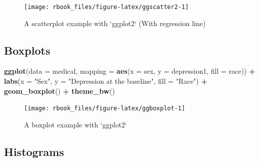 \documentclass[]{book}
\newenvironment{Shaded}{\begin{snugshade}}{\end{snugshade}}
\newcommand{\DataTypeTok}[1]{\textcolor[rgb]{0.13,0.29,0.53}{#1}}
\newcommand{\KeywordTok}[1]{\textcolor[rgb]{0.13,0.29,0.53}{\textbf{#1}}}
\newcommand{\NormalTok}[1]{#1}
\newcommand{\OperatorTok}[1]{\textcolor[rgb]{0.81,0.36,0.00}{\textbf{#1}}}
\newcommand{\StringTok}[1]{\textcolor[rgb]{0.31,0.60,0.02}{#1}}
\begin{document}
\begin{figure}

{\centering \texttt{[image: rbook\_files/figure-latex/ggscatter2-1]} 

}

\caption{A scatterplot example with `ggplot2` (With regression line)}\label{fig:ggscatter2}
\end{figure}

\hypertarget{boxplots-1}{%
\subsection{Boxplots}\label{boxplots-1}}

\begin{Shaded}
\begin{Highlighting}[]
\KeywordTok{ggplot}\NormalTok{(}\DataTypeTok{data =}\NormalTok{ medical, }
       \DataTypeTok{mapping =} \KeywordTok{aes}\NormalTok{(}\DataTypeTok{x =}\NormalTok{ sex, }\DataTypeTok{y =}\NormalTok{ depression1, }\DataTypeTok{fill =}\NormalTok{ race)) }\OperatorTok{+}\StringTok{ }
\StringTok{  }\KeywordTok{labs}\NormalTok{(}\DataTypeTok{x =} \StringTok{"Sex"}\NormalTok{, }
       \DataTypeTok{y =} \StringTok{"Depression at the baseline"}\NormalTok{, }
       \DataTypeTok{fill =} \StringTok{"Race"}\NormalTok{) }\OperatorTok{+}\StringTok{ }
\StringTok{  }\KeywordTok{geom_boxplot}\NormalTok{() }\OperatorTok{+}
\StringTok{  }\KeywordTok{theme_bw}\NormalTok{()}
\end{Highlighting}
\end{Shaded}

\begin{figure}

{\centering \texttt{[image: rbook\_files/figure-latex/ggboxplot-1]} 

}

\caption{A boxplot example with `ggplot2`}\label{fig:ggboxplot}
\end{figure}

\hypertarget{histograms-1}{%
\subsection{Histograms}\label{histograms-1}}
\end{document}
